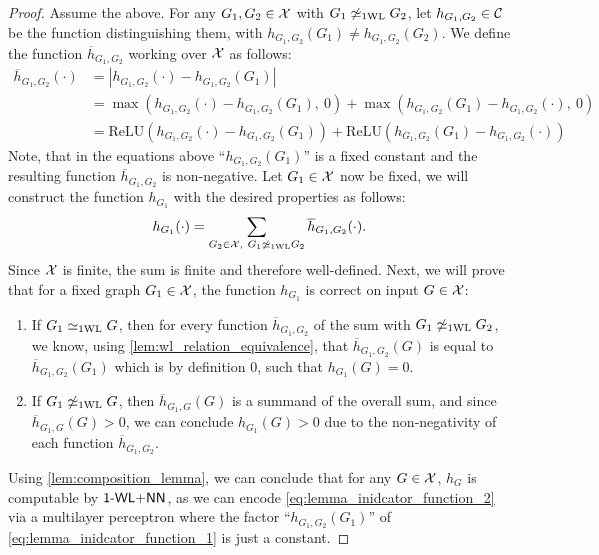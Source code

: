 \begin{proof}
    Assume the above. For any $G_1, G_2 \in \mathcal{X}$ with $G_1 \not\simeq_{\text{1WL}} G_2$, let $h_{G_1, G_2} \in \mathcal{C}$ be the function distinguishing them, with $h_{G_1, G_2}(G_1) \neq h_{G_1, G_2}(G_2)$. We define the function $\overline{h}_{G_1,G_2}$ working over $\mathcal{X}$ as follows:
    \begin{align}\label{eq:lemma_inidcator_function_1}
        \overline{h}_{G_1, G_2}(\cdot) &= |h_{G_1, G_2}(\cdot) - h_{G_1, G_2}(G_1)| \nonumber\\
        &= \max(h_{G_1, G_2}(\cdot) - h_{G_1, G_2}(G_1), \ 0) + \max(h_{G_1, G_2}(G_1) - h_{G_1, G_2}(\cdot), \ 0) \nonumber\\
        &= \text{ReLU}(h_{G_1, G_2}(\cdot) - h_{G_1, G_2}(G_1)) + \text{ReLU}(h_{G_1, G_2}(G_1) - h_{G_1, G_2}(\cdot))
    \end{align}
    Note, that in the equations above ``$h_{G_1, G_2}(G_1)$'' is a fixed constant and the resulting function $\overline{h}_{G_1, G_2}$ is non-negative.
    Let $G_1 \in \mathcal{X}$ now be fixed, we will construct the function $h_{G_1}$ with the desired properties as follows:
    \begin{align}\label{eq:lemma_inidcator_function_2}
        h_{G_1}(\cdot) = \sum_{G_2 \in \mathcal{X}, \ G_1 \not\simeq_{\text{1WL}} G_2} \overline{h}_{G_1, G_2}(\cdot).
    \end{align}
    Since $\mathcal{X}$ is finite, the sum is finite and therefore well-defined. Next, we will prove that for a fixed graph $G_1 \in \mathcal{X}$, the function $h_{G_1}$ is correct on input $G \in \mathcal{X}$:
    \begin{enumerate}
        \item If $G_1 \simeq_{\text{1WL}} G$, then for every function $\overline{h}_{G_1, G_2}$ of the sum with $G_1 \not\simeq_{\text{1WL}} G_2$, we know, using \autoref{lem:wl_relation_equivalence}, that $\overline{h}_{G_1, G_2}(G)$ is equal to $\overline{h}_{G_1, G_2}(G_1)$ which is by definition $0$, such that $h_{G_1}(G) = 0$.
        \item If $G_1 \not\simeq_{\text{1WL}} G$, then $\overline{h}_{G_1, G}(G)$ is a summand of the overall sum, and since $\overline{h}_{G_1, G}(G) > 0$, 
        we can conclude $h_{G_1}(G) > 0$ due to the non-negativity of each function $\overline{h}_{G_1, G_2}$.
    \end{enumerate}
    Using \cref{lem:composition_lemma}, we can conclude that for any $G \in \mathcal{X}$, $h_G$ is computable by $\textsf{1-WL+NN}$, as we can encode \autoref{eq:lemma_inidcator_function_2} via a multilayer perceptron where the factor ``$h_{G_1, G_2}(G_1)$'' of \autoref{eq:lemma_inidcator_function_1} is just a constant.
\end{proof}

